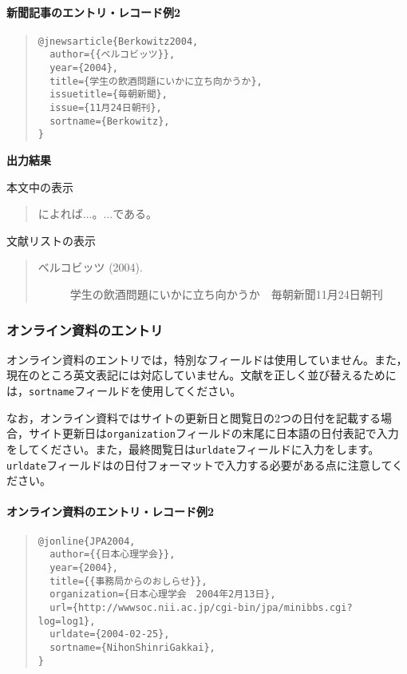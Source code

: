 \documentclass[12pt]{ltjsarticle}
\begin{document}
\paragraph{新聞記事のエントリ・レコード例2}

\begin{quote}
\begin{verbatim}
@jnewsarticle{Berkowitz2004,
  author={{ベルコビッツ}},
  year={2004},
  title={学生の飲酒問題にいかに立ち向かうか},
  issuetitle={毎朝新聞},
  issue={11月24日朝刊},
  sortname={Berkowitz},
}
\end{verbatim}
\end{quote}

\textbf{出力結果}

本文中の表示
\begin{quote}
\textcite{Berkowitz2004}によれば...。...である\parencite{Berkowitz2004}。
\end{quote}

文献リストの表示
\begin{quote}
\begin{description}
  \item[\textrm{ベルコビッツ (2004).}]学生の飲酒問題にいかに立ち向かうか　毎朝新聞11月24日朝刊
\end{description}
\end{quote}

\subsubsection{オンライン資料のエントリ}

オンライン資料のエントリでは，特別なフィールドは使用していません。また，現在のところ英文表記には対応していません。文献を正しく並び替えるためには，\texttt{sortname}フィールドを使用してください。

なお，オンライン資料ではサイトの更新日と閲覧日の2つの日付を記載する場合，サイト更新日は\texttt{organization}フィールドの末尾に日本語の日付表記で入力をしてください。また，最終閲覧日は\texttt{urldate}フィールドに入力をします。\texttt{urldate}フィールドは{\BibLaTeX}の日付フォーマットで入力する必要がある点に注意してください。

\paragraph{オンライン資料のエントリ・レコード例2}

\begin{quote}
\begin{verbatim}
@jonline{JPA2004,
  author={{日本心理学会}},
  year={2004},
  title={{事務局からのおしらせ}},
  organization={日本心理学会　2004年2月13日},
  url={http://wwwsoc.nii.ac.jp/cgi-bin/jpa/minibbs.cgi?log=log1},
  urldate={2004-02-25},
  sortname={NihonShinriGakkai},
}
\end{verbatim}
\end{quote}
\end{document}
